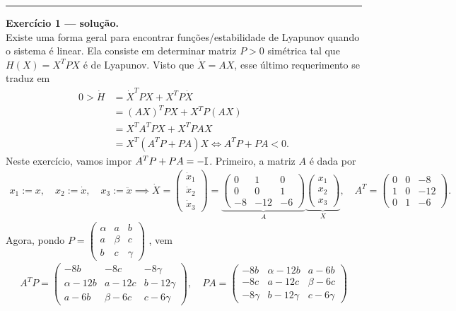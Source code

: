 \noindent\rule{\textwidth}{0.5pt}
\noindent
\textbf{\sffamily Exercício 1 --- solução.} \\
	Existe uma forma geral para encontrar funções/estabilidade de Lyapunov quando o sistema é linear. 
	Ela consiste em determinar matriz $P>0$ simétrica tal que $H(X) = X^TPX$ é de Lyapunov. 
	Visto que $\dot{X} = AX$, esse último requerimento se traduz em 
	\begin{align*}
		0 >
		\dot{H} &= \dot{X}^TPX + X^TP\dot{X} \\
		        &= (AX)^TPX + X^TP(AX) \\
		        &= X^TA^TPX + X^TPAX \\
		        &= X^T(A^TP + PA)X 
		\iff
		A^TP + PA < 0.
	\end{align*}
	Neste exercício, vamos impor $A^TP + PA = -\mathbb{I}$.
	Primeiro, a matriz $A$ é dada por
	\begin{align*}
		x_1 := x, \quad
		x_2 := \dot{x}, \quad 
		x_3 := \ddot{x} 
		\implies 
		\dot{X} = 
		\begin{pmatrix}
			\dot{x}_1 \\ \dot{x}_2 \\ \dot{x}_3
		\end{pmatrix}
		=	
		\underbrace{
		\begin{pmatrix}
			0 & 1 & 0 \\
			0 & 0 & 1 \\
			-8 & -12 & -6
		\end{pmatrix}
		}_A
		\underbrace{
		\begin{pmatrix}
			x_1 \\ x_2 \\ x_3
		\end{pmatrix}
		}_X,
		\quad
		A^T
		=
		\begin{pmatrix}
			0 & 0 & -8 \\
			1 & 0 & -12 \\
			0 & 1 & -6
		\end{pmatrix}.
	\end{align*}
	Agora, pondo 
	\(
		P 
		=
		\begin{pmatrix}
			\alpha &   a   &   b    \\
			   a   & \beta &   c    \\
			   b   &   c   & \gamma
		\end{pmatrix} 
	\)
	, vem
	\begin{align*}
		A^T P = 
		\begin{pmatrix}
			   -8b     &   -8c    &  -8\gamma  \\
			\alpha-12b &   a-12c  & b-12\gamma \\
			   a-6b    & \beta-6c & c-6\gamma
		\end{pmatrix},
		\quad
		PA =
		\begin{pmatrix}
			  -8b    & \alpha-12b &   a-6b    \\
			  -8c    &   a-12c    & \beta-6c  \\
			-8\gamma & b-12\gamma & c-6\gamma 
		\end{pmatrix}
	\end{align*}
